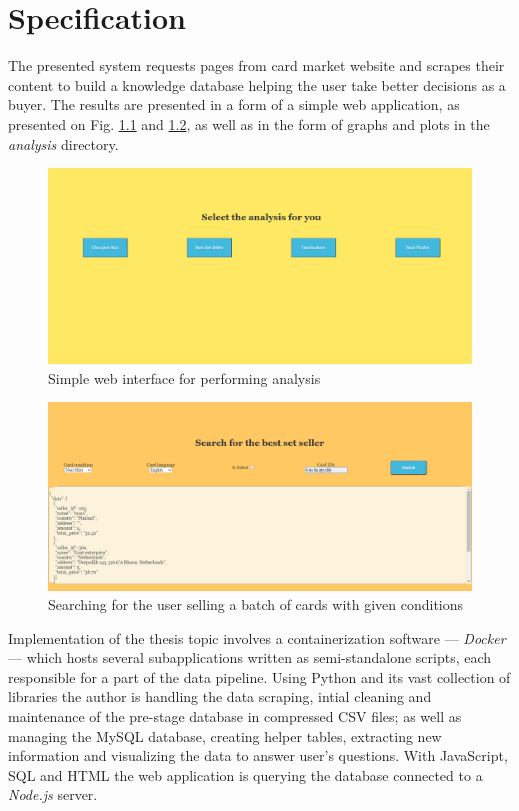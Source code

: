 \chapter{Specification}
\label{ch:specification}
The presented system requests pages from card market website and scrapes their content to build a knowledge database helping the user take better decisions as a buyer. The results are presented in a form of a simple web application, as presented on Fig. \ref{fig:web_app} and \ref{fig:web_app_best_set_seller}, as well as in the form of graphs and plots in the \textit{analysis} directory.

\begin{figure}
    \centering
    \includegraphics[width=\textwidth]{figures/web_app.png}
    \caption{Simple web interface for performing analysis}
    \label{fig:web_app}
\end{figure}

\begin{figure}
    \centering
    \includegraphics[width=\textwidth]{figures/web_app_best_set_seller.png}
    \caption{Searching for the user selling a batch of cards with given conditions}
    \label{fig:web_app_best_set_seller}
\end{figure}

Implementation of the thesis topic involves a containerization software --- \textit{Docker} --- which hosts several subapplications written as semi-standalone scripts, each responsible for a part of the data pipeline. Using Python and its vast collection of libraries the author is handling the data scraping, intial cleaning and maintenance of the pre-stage database in compressed CSV files; as well as managing the MySQL database, creating helper tables, extracting new information and visualizing the data to answer user's questions. With JavaScript, SQL and HTML the web application is querying the database connected to a \textit{Node.js} server.


